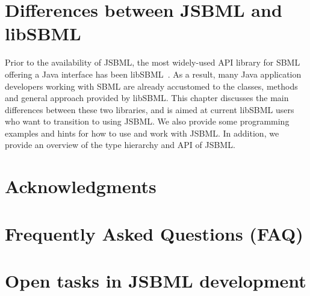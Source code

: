 \documentclass{JSBMLdoc}
\begin{document}





\chapter{Differences between JSBML and libSBML}
\label{chp:jsbml-libsbml-diffs}

Prior to the availability of JSBML, the most widely-used API library for
SBML offering a Java interface has been libSBML~\cite{Bornstein2008}. As a
result, many Java application developers working with SBML are already
accustomed to the classes, methods and general approach provided by
libSBML. This chapter discusses the main differences between these two
libraries, and is aimed at current libSBML users who want to transition to
using JSBML. We also provide some programming examples and hints for how
to use and work with JSBML. In addition, we provide an overview of the type hierarchy 
and API of JSBML.





\chapter{Acknowledgments}
\label{chp:acknowledgements}




\appendix

\chapter{Frequently Asked Questions (FAQ)}
\label{chp:faq}




\chapter{Open tasks in JSBML development}
\label{chp:open-tasks}




\clearpage

\thispagestyle{plain}
\pagestyle{plain}


\setindexprenote{\vspace*{0.1ex}}
\printindex
\end{document}
